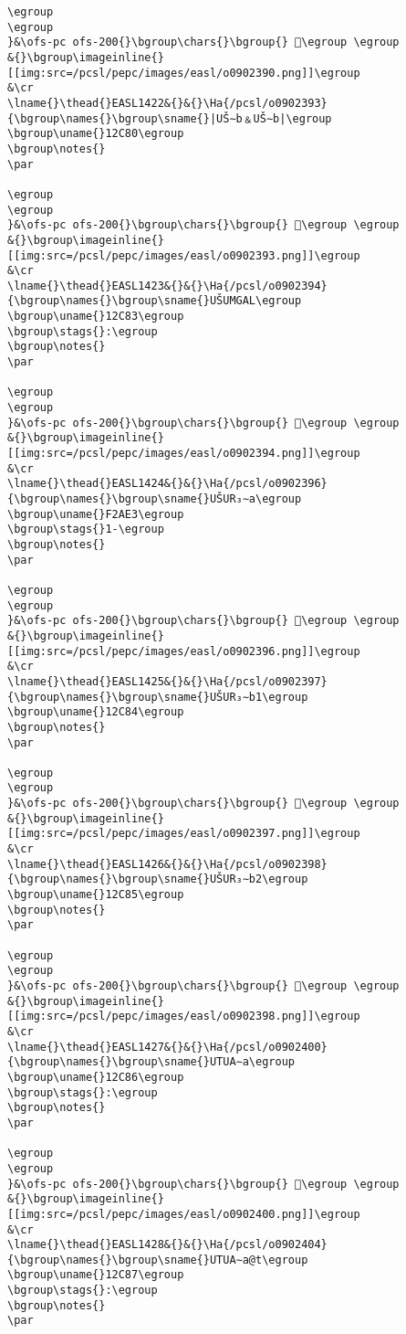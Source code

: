 \begin{verbatim}
\egroup
\egroup
}&\ofs-pc ofs-200{}\bgroup\chars{}\bgroup{} 󲺕\egroup \egroup
&{}\bgroup\imageinline{}[[img:src=/pcsl/pepc/images/easl/o0902390.png]]\egroup
&\cr
\lname{}\thead{}EASL1422&{}&{}\Ha{/pcsl/o0902393}{\bgroup\names{}\bgroup\sname{}|UŠ∼b﹠UŠ∼b|\egroup
\bgroup\uname{}12C80\egroup
\bgroup\notes{}
\par 

\egroup
\egroup
}&\ofs-pc ofs-200{}\bgroup\chars{}\bgroup{} 𒲀\egroup \egroup
&{}\bgroup\imageinline{}[[img:src=/pcsl/pepc/images/easl/o0902393.png]]\egroup
&\cr
\lname{}\thead{}EASL1423&{}&{}\Ha{/pcsl/o0902394}{\bgroup\names{}\bgroup\sname{}UŠUMGAL\egroup
\bgroup\uname{}12C83\egroup
\bgroup\stags{}:\egroup
\bgroup\notes{}
\par 

\egroup
\egroup
}&\ofs-pc ofs-200{}\bgroup\chars{}\bgroup{} 𒲃\egroup \egroup
&{}\bgroup\imageinline{}[[img:src=/pcsl/pepc/images/easl/o0902394.png]]\egroup
&\cr
\lname{}\thead{}EASL1424&{}&{}\Ha{/pcsl/o0902396}{\bgroup\names{}\bgroup\sname{}UŠUR₃∼a\egroup
\bgroup\uname{}F2AE3\egroup
\bgroup\stags{}1-\egroup
\bgroup\notes{}
\par 

\egroup
\egroup
}&\ofs-pc ofs-200{}\bgroup\chars{}\bgroup{} 󲫣\egroup \egroup
&{}\bgroup\imageinline{}[[img:src=/pcsl/pepc/images/easl/o0902396.png]]\egroup
&\cr
\lname{}\thead{}EASL1425&{}&{}\Ha{/pcsl/o0902397}{\bgroup\names{}\bgroup\sname{}UŠUR₃∼b1\egroup
\bgroup\uname{}12C84\egroup
\bgroup\notes{}
\par 

\egroup
\egroup
}&\ofs-pc ofs-200{}\bgroup\chars{}\bgroup{} 𒲄\egroup \egroup
&{}\bgroup\imageinline{}[[img:src=/pcsl/pepc/images/easl/o0902397.png]]\egroup
&\cr
\lname{}\thead{}EASL1426&{}&{}\Ha{/pcsl/o0902398}{\bgroup\names{}\bgroup\sname{}UŠUR₃∼b2\egroup
\bgroup\uname{}12C85\egroup
\bgroup\notes{}
\par 

\egroup
\egroup
}&\ofs-pc ofs-200{}\bgroup\chars{}\bgroup{} 𒲅\egroup \egroup
&{}\bgroup\imageinline{}[[img:src=/pcsl/pepc/images/easl/o0902398.png]]\egroup
&\cr
\lname{}\thead{}EASL1427&{}&{}\Ha{/pcsl/o0902400}{\bgroup\names{}\bgroup\sname{}UTUA∼a\egroup
\bgroup\uname{}12C86\egroup
\bgroup\stags{}:\egroup
\bgroup\notes{}
\par 

\egroup
\egroup
}&\ofs-pc ofs-200{}\bgroup\chars{}\bgroup{} 𒲆\egroup \egroup
&{}\bgroup\imageinline{}[[img:src=/pcsl/pepc/images/easl/o0902400.png]]\egroup
&\cr
\lname{}\thead{}EASL1428&{}&{}\Ha{/pcsl/o0902404}{\bgroup\names{}\bgroup\sname{}UTUA∼a@t\egroup
\bgroup\uname{}12C87\egroup
\bgroup\stags{}:\egroup
\bgroup\notes{}
\par 


\end{verbatim}
